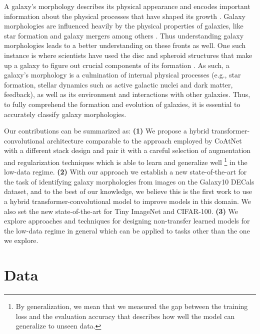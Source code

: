 \documentclass{article} \usepackage{iclr2023_conference,times}
\begin{document}
A galaxy's morphology describes its physical appearance and encodes important information about the physical processes that have shaped its growth \citep{10.1111/j.1365-2966.2009.14921.x}. Galaxy morphologies are influenced heavily by the physical properties of galaxies, like star formation \citep{hashimoto1998influence, sandage1986star, lotz2006rest} and galaxy mergers \citep{rodriguez2017role} among others \citep{https://doi.org/10.48550/arxiv.1102.0550}. Thus understanding galaxy morphologies leads to a better understanding on these fronts as well. One such instance is where scientists have used the disc and spheroid structures that make up a galaxy to figure out crucial components of its formation \citep{10.1007/978-3-540-28642-4_2}. As such, a galaxy's morphology is a culmination of internal physical processes (e.g., star formation, stellar dynamics such as active galactic nuclei and dark matter, feedback), as well as its environment and interactions with other galaxies. Thus, to fully comprehend the formation and evolution of galaxies, it is essential to accurately classify galaxy morphologies.

Our contributions can be summarized as: \textbf{(1)} We propose a hybrid transformer-convolutional architecture comparable to the approach employed by CoAtNet \citep{dai2021coatnet} with a different stack design and pair it with a careful selection of augmentation and regularization techniques which is able to learn and generalize well \footnote{By generalization, we mean that we measured the gap between the training loss and the evaluation accuracy that describes how well the model can generalize to unseen data.} in the low-data regime. \textbf{(2)} With our approach we establish a new state-of-the-art for the task of identifying galaxy morphologies from images on the Galaxy10 DECals dataset, and to the best of our knowledge, we believe this is the first work to use a hybrid transformer-convolutional model to improve models in this domain. We also set the new state-of-the-art for Tiny ImageNet and CIFAR-100. \textbf{(3)} We explore approaches and techniques for designing non-transfer learned models for the low-data regime in general which can be applied to tasks other than the one we explore.

\section{Data}
\label{Data}
\end{document}
